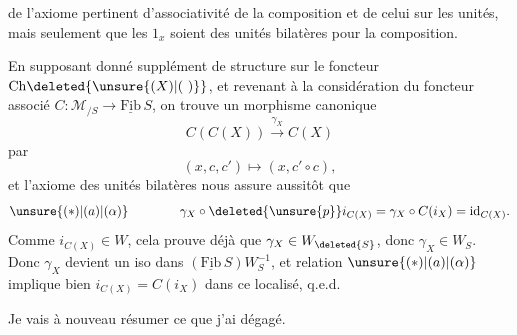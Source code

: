 de l'axiome pertinent d'associativité de la composition
et de celui sur les unités, mais seulement que
les $1_x$ soient des unités bilatères pour la
composition.

En supposant donné  supplément de
structure sur le foncteur $\mathrm{Ch}\deleted{\unsure{(X)|(\ )}}$,  et
revenant à la considération du foncteur
associé $C:\mathcal M_{/S}\longrightarrow\underline{\mathrm{Fib}}\,S$,
on trouve un morphisme canonique
\[
C(C(X))\xrightarrow{\gamma_X}C(X)
\]
par
\[
(x,c,c')\longmapsto(x,c'\circ c),
\]
et l'axiome des unités bilatères nous
assure aussitôt que
\[
\unsure{(*)|(a)|(\alpha)}\qquad\qquad \gamma_X\circ\deleted{\unsure{p}}i_{C(X)}=\gamma_X\circ C(i_X)=\mathrm{id}_{C(X)}.
\]
Comme $i_{C(X)}\in W$, cela prouve déjà que
$\gamma_X\in W_{\deleted{S}}$, donc $\gamma_X\in W_S$. Donc $\gamma_X$ devient
un iso dans $(\underline{\mathrm{Fib}}\,S)W_S^{-1}$, et 
relation $\unsure{(*)|(a)|(\alpha)}$ implique bien $i_{C(X)}=C(i_X)$
dans ce localisé, q.e.d.

Je vais à nouveau résumer ce que j'ai
dégagé.
